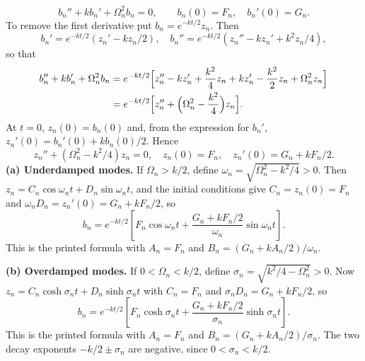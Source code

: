 \[
b_n''+kb_n'+\Omega_n^2b_n=0,
\qquad b_n(0)=F_n,\quad b_n'(0)=G_n.
\]
To remove the first derivative put $b_n=e^{-kt/2}z_n$.
Then
\[
b_n'=e^{-kt/2}(z_n'-kz_n/2),\quad
b_n''=e^{-kt/2}(z_n''-kz_n'+k^2z_n/4),
\]
so that
\begin{align*}
b_n''+kb_n'+\Omega_n^2b_n
&=e^{-kt/2}\Bigl[z_n''-kz_n'+\frac{k^2}{4}z_n
+kz_n'-\frac{k^2}{2}z_n+\Omega_n^2z_n\Bigr]\\
&=e^{-kt/2}\Bigl[z_n''+\Bigl(\Omega_n^2-\frac{k^2}{4}\Bigr)z_n\Bigr].
\end{align*}
At $t=0$, $z_n(0)=b_n(0)$ and, from the expression for $b_n'$,
$z_n'(0)=b_n'(0)+kb_n(0)/2$. Hence
\[
z_n''+(\Omega_n^2-k^2/4)z_n=0,
\quad z_n(0)=F_n,\quad z_n'(0)=G_n+kF_n/2.
\]
\textbf{(a) Underdamped modes.} If $\Omega_n>k/2$, define
$\omega_n=\sqrt{\Omega_n^2-k^2/4}>0$. Then
$z_n=C_n\cos\omega_nt+D_n\sin\omega_nt$, and the initial conditions
give $C_n=z_n(0)=F_n$ and $\omega_nD_n=z_n'(0)=G_n+kF_n/2$, so
\[
\boxed{b_n=e^{-kt/2}\left[F_n\cos\omega_nt
+\frac{G_n+kF_n/2}{\omega_n}\sin\omega_nt\right].}
\]
This is the printed formula with $A_n=F_n$ and
$B_n=(G_n+kA_n/2)/\omega_n$.

\textbf{(b) Overdamped modes.} If $0<\Omega_n<k/2$, define
$\sigma_n=\sqrt{k^2/4-\Omega_n^2}>0$. Now
$z_n=C_n\cosh\sigma_nt+D_n\sinh\sigma_nt$ with $C_n=F_n$ and
$\sigma_nD_n=G_n+kF_n/2$, so
\[
\boxed{b_n=e^{-kt/2}\left[F_n\cosh\sigma_nt
+\frac{G_n+kF_n/2}{\sigma_n}\sinh\sigma_nt\right].}
\]
This is the printed formula with $A_n=F_n$ and
$B_n=(G_n+kA_n/2)/\sigma_n$. The two decay exponents
$-k/2\pm\sigma_n$ are negative, since $0<\sigma_n<k/2$.

